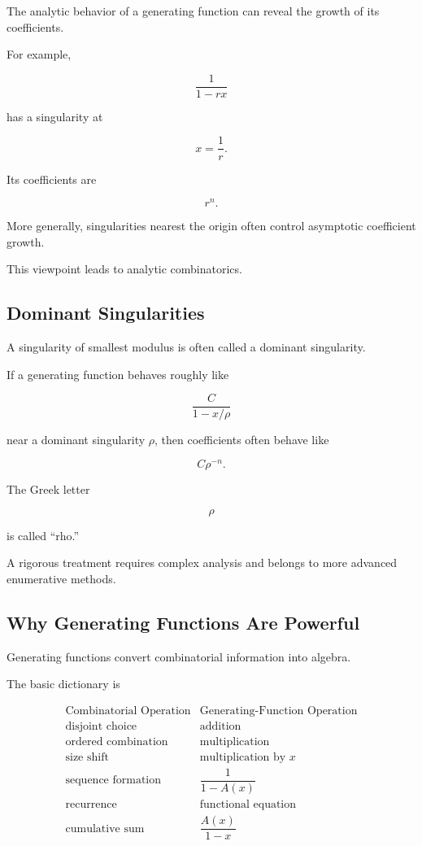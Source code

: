 The analytic behavior of a generating function can reveal the growth of
its coefficients.

For example,

\[
\frac{1}{1-rx}
\]

has a singularity at

\[
x=\frac1r.
\]

Its coefficients are

\[
r^n.
\]

More generally, singularities nearest the origin often control
asymptotic coefficient growth.

This viewpoint leads to analytic combinatorics.

\subsection{Dominant Singularities}
\label{subsec:dominant-singularities-preview}

A singularity of smallest modulus is often called a dominant
singularity.

If a generating function behaves roughly like

\[
\frac{C}{1-x/\rho}
\]

near a dominant singularity \(\rho\), then coefficients often behave
like

\[
\boxed{
C\rho^{-n}.
}
\]

The Greek letter

\[
\rho
\]

is called ``rho.''

A rigorous treatment requires complex analysis and belongs to more
advanced enumerative methods.

\subsection{Why Generating Functions Are Powerful}
\label{subsec:why-gf-powerful}

Generating functions convert combinatorial information into algebra.

The basic dictionary is

\[
\boxed{
\begin{array}{c|c}
\text{Combinatorial Operation}
&
\text{Generating-Function Operation}\\
\hline
\text{disjoint choice}
&
\text{addition}\\
\text{ordered combination}
&
\text{multiplication}\\
\text{size shift}
&
\text{multiplication by }x\\
\text{sequence formation}
&
\dfrac{1}{1-A(x)}\\
\text{recurrence}
&
\text{functional equation}\\
\text{cumulative sum}
&
\dfrac{A(x)}{1-x}
\end{array}
}
\]

